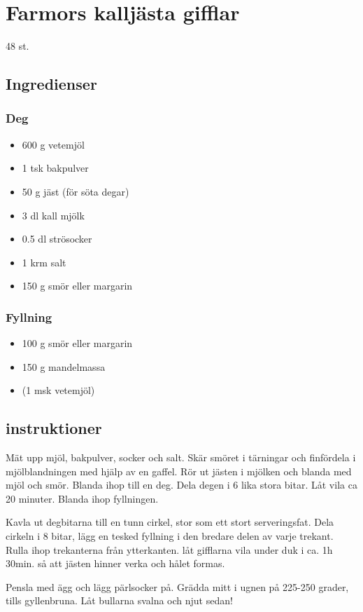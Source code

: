\section{Farmors kallj\"asta gifflar}
48 st.

\subsection{Ingredienser}
\subsubsection{Deg}
\begin{itemize}
        \item 600 g vetemj\"ol
        \item 1 tsk bakpulver
        \item 50 g j\"ast (f\"or s\"ota degar)
        \item 3 dl kall mj\"olk
        \item 0.5 dl str\"osocker
        \item 1 krm salt
        \item 150 g sm\"or eller margarin
\end{itemize}
\subsubsection{Fyllning}
\begin{itemize}
        \item 100 g sm\"or eller margarin
        \item 150 g mandelmassa
        \item (1 msk vetemj\"ol)
\end{itemize}

\subsection{instruktioner}
M\"at upp mj\"ol, bakpulver, socker och salt. Sk\"ar sm\"oret i t\"arningar och finf\"ordela i mj\"olblandningen med hj\"alp av en gaffel.
R\"or ut j\"asten i mj\"olken och blanda med mj\"ol och sm\"or. Blanda ihop till en deg. Dela degen i 6 lika stora bitar. L{\aa}t vila ca 20 minuter.
Blanda ihop fyllningen.

Kavla ut degbitarna till en tunn cirkel, stor som ett stort serveringsfat. Dela cirkeln i 8 bitar, l\"agg en tesked fyllning i den bredare delen av varje trekant.
Rulla ihop trekanterna fr{\aa}n ytterkanten. l{\aa}t gifflarna vila under duk i ca. 1h 30min. s{\aa} att j\"asten hinner verka och h{\aa}let formas.

Pensla med \"agg och l\"agg p\"arlsocker p{\aa}. Gr\"adda mitt i ugnen p{\aa} 225-250 grader, tills gyllenbruna.
L{\aa}t bullarna svalna och njut sedan!
